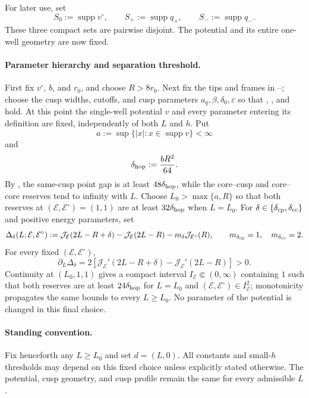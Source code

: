 \documentclass[11pt]{article}
\newcommand{\eps}{\varepsilon}
\newcommand{\cE}{\mathcal E}
\newcommand{\cJ}{\mathcal J}
\newcommand{\supp}{\operatorname{supp}}
\begin{document}
For later use, set
\begin{equation}\label{eq:component-supports}
 S_0:=\supp v^\circ,
 \qquad
 S_+:=\supp q_+,
 \qquad
 S_-:=\supp q_-.
\end{equation}
These three compact sets are pairwise disjoint.  The potential and its entire
one-well geometry are now fixed.

\paragraph{Parameter hierarchy and separation threshold.}
First fix $v^\circ$, $b$, and $r_0$, and choose $R>8r_0$.  Next fix the
tips and frames in --; choose the
cusp widths, cutoffs, and cusp parameters $a_q,\beta,\delta_0,\eps$ so that
, , and
 hold.  At this point the single-well potential
$v$ and every parameter entering its definition are fixed, independently of
both $L$ and $h$.  Put
\begin{equation}\label{eq:support-radius-a}
 a:=\sup\{|x|:x\in\supp v\}<\infty
\end{equation}
and
\begin{equation}\label{eq:delta-hop}
 \delta_{\rm hop}:=\frac{bR^2}{64}.
\end{equation}
By , the same-cusp point gap is
at least $48\delta_{\rm hop}$, while the core--cusp and core--core reserves
tend to infinity with $L$.  Choose $L_0>\max\{a,R\}$ so that both reserves at
$(\cE,\cE^\circ)=(1,1)$ are at least $32\delta_{\rm hop}$ when $L=L_0$.
For $\delta\in\{\delta_{\rm cp},\delta_{\rm cc}\}$ and positive energy
parameters, set
\[
 \Delta_\delta(L;\cE,\cE^\circ)
 :=\cJ_\cE(2L-R+\delta)-\cJ_\cE(2L-R)
   -m_\delta\cJ_{\cE^\circ}(R),
 \qquad
 m_{\delta_{\rm cp}}=1,
 \quad m_{\delta_{\rm cc}}=2.
\]
For every fixed $(\cE,\cE^\circ)$,
\[
 \partial_L\Delta_\delta
 =2\left[
 \cJ_\cE'(2L-R+\delta)-\cJ_\cE'(2L-R)
 \right]>0.
\]
Continuity at $(L_0,1,1)$ gives a compact interval
$I_\cE\Subset(0,\infty)$ containing $1$ such that both reserves are at least
$24\delta_{\rm hop}$ for $L=L_0$ and
$(\cE,\cE^\circ)\in I_\cE^2$; monotonicity propagates the same bounds to
every $L\ge L_0$.  No parameter of the potential is changed in this final
choice.

\paragraph{Standing convention.}
Fix henceforth any $L\ge L_0$ and set $d=(L,0)$.  All constants and small-$h$
thresholds may depend on this fixed choice unless explicitly stated
otherwise.  The potential, cusp geometry, and cusp profile remain the
same for every admissible $L$.
\end{document}
